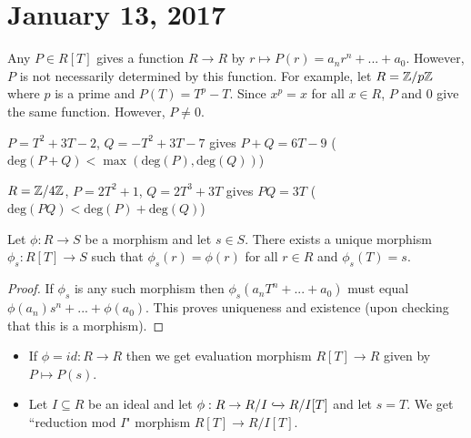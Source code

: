 \section{January 13, 2017} %

\begin{rmk}
Any $P \in R[T]$ gives a function $R \rightarrow R$ by $r \mapsto P(r) = a_nr^n + ... + a_0$.  However, $P$ is not necessarily determined by this function.  For example, let $R = \mathbb{Z} / p\mathbb{Z}$ where $p$ is a prime and $P(T) = T^p - T$.  Since $x^p = x$ for all $x \in R$, $P$ and $0$ give the same function.  However, $P \neq 0$.
\end{rmk}

\begin{ex}

\item $P = T^2 + 3T - 2$, $Q = -T^2 + 3T - 7$ gives $P+Q = 6T - 9$ ($\text{deg}(P+Q) < \max(\text{deg}(P),\text{deg}(Q))$)

\item $R = \mathbb{Z}/4\mathbb{Z}$, $P = 2T^2+1$, $Q = 2T^3+3T$ gives $PQ = 3T$ ($\text{deg}(PQ) < \text{deg}(P)+\text{deg}(Q)$)

\end{ex}

\begin{fact}
Let $\phi : R \rightarrow S$ be a morphism and let $s \in S$.  There exists a unique morphism $\phi_s : R[T] \rightarrow S$ such that $\phi_s(r) = \phi(r)$ for all $r \in R$ and $\phi_s(T) = s$.
\end{fact}

\begin{proof}
If $\phi_s$ is any such morphism then $\phi_s(a_nT^n + ... + a_0)$ must equal $\phi(a_n)s^n + ... + \phi(a_0)$.  This proves uniqueness and existence (upon checking that this is a morphism).
\end{proof}

\begin{ex} \hspace{0.5cm}

\begin{itemize}

\item If $\phi = id : R \rightarrow R$ then we get evaluation morphism $R[T] \rightarrow R$ given by $P \mapsto P(s)$.

\item Let $I \subseteq R$ be an ideal and let $\phi : R \rightarrow R/I \xhookrightarrow{} R/I[T]$ and let $s = T$.  We get ``reduction mod $I$" morphism $R[T]\rightarrow R/I[T]$.

\end{itemize}

\end{ex}

